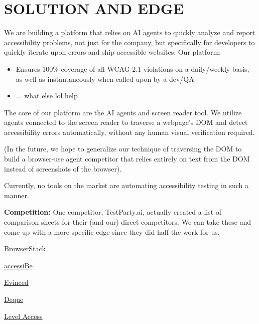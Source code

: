 \section{SOLUTION AND EDGE}
We are building a platform that relies on AI agents to quickly analyze and report accessibility problems, not just for the company, but specifically for developers to quickly iterate upon errors and ship accessible websites. Our platform:
\vspace{-0.5em}
\begin{itemize}[noitemsep]
    \item Ensures 100\% coverage of all WCAG 2.1 violations on a daily/weekly basis, as well as instantaneously when called upon by a dev/QA
    \item ... what else lol help
\end{itemize}
\vspace{-0.5em}

The core of our platform are the AI agents and screen reader tool. We utilize agents connected to the screen reader to traverse a webpage's DOM and detect accessibility errors automatically, without any human visual verification required. 

(In the future, we hope to generalize our technique of traversing the DOM to build a browser-use agent competitor that relies entirely on text from the DOM instead of screenshots of the browser).

Currently, no tools on the market are automating accessibility testing in such a manner.

\textbf{Competition:}
One competitor, TestParty.ai, actually created a list of comparison sheets for their (and our) direct competitors. We can take these and come up with a more specific edge since they did half the work for us.

\href{https://docs.google.com/spreadsheets/d/1kwO59YhMjCMFA10uVmhMSY2MzajYV_xlmmT7f2pqnCQ/edit?gid=341975604#gid=341975604}{BrowserStack}

\href{https://docs.google.com/spreadsheets/d/1tQvP-EH_zTHU7yy8FAqanjfP_HxO3DcKT7B_RJo8y3s/edit?gid=2092862956#gid=2092862956}{accessiBe}

\href{https://docs.google.com/spreadsheets/d/1SBt0X3tEOOkkAydGDxnTUuCwWjNlLqUOd6BjAicuZIk/edit?gid=341975604#gid=341975604}{Evinced}

\href{https://docs.google.com/spreadsheets/d/1yJ3LYM08dTz5_2XZuRsPVcVLytmLFtvTTiW_rFqSS2o/edit?gid=341975604#gid=341975604}{Deque}

\href{https://docs.google.com/spreadsheets/d/1ztxqLq_EjeOvK6zflibTAFhzpawkYc2Gjv7iUVYsOxM/edit?gid=2092862956#gid=2092862956}{Level Access}

